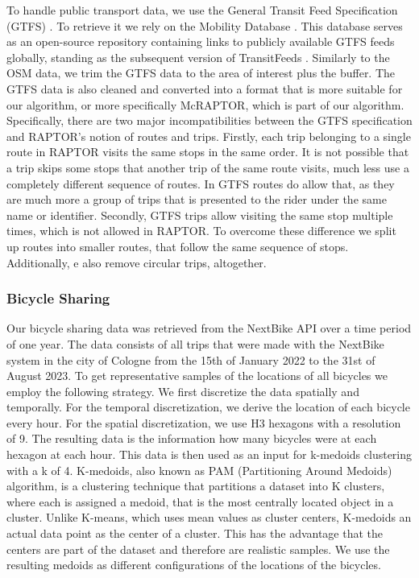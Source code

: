To handle public transport data, we use the General Transit Feed Specification (GTFS) .
To retrieve it we rely on the Mobility Database .
This database serves as an open-source repository containing links to publicly available GTFS feeds globally, standing as the subsequent version of TransitFeeds .
Similarly to the OSM data, we trim the GTFS data to the area of interest plus the buffer.
The GTFS data is also cleaned and converted into a format that is more suitable for our algorithm, or more specifically McRAPTOR, which is part of our algorithm.
Specifically, there are two major incompatibilities between the GTFS specification and RAPTOR's notion of routes and trips.
Firstly, each trip belonging to a single route in RAPTOR visits the same stops in the same order.
It is not possible that a trip skips some stops that another trip of the same route visits, much less use a completely different sequence of routes.
In GTFS routes do allow that, as they are much more a group of trips that is presented to the rider under the same name or identifier.
Secondly, GTFS trips allow visiting the same stop multiple times, which is not allowed in RAPTOR.
To overcome these difference we split up routes into smaller routes, that follow the same sequence of stops.
Additionally, e also remove circular trips, altogether.


\subsubsection{Bicycle Sharing}
\label{subs:bicycle_sharing}

Our bicycle sharing data was retrieved from the NextBike API over a time period of one year.
The data consists of all trips that were made with the NextBike system in the city of Cologne from the 15th of January 2022 to the 31st of August 2023.
To get representative samples of the locations of all bicycles we employ the following strategy.
We first discretize the data spatially and temporally.
For the temporal discretization, we derive the location of each bicycle every hour.
For the spatial discretization, we use H3 hexagons with a resolution of 9.
The resulting data is the information how many bicycles were at each hexagon at each hour.
This data is then used as an input for k-medoids clustering  with a k of 4.
K-medoids, also known as PAM (Partitioning Around Medoids) algorithm, is a clustering technique that partitions a dataset into K clusters, where each is assigned a medoid, that is the most centrally located object in a cluster. 
Unlike K-means, which uses mean values as cluster centers, K-medoids an actual data point as the center of a cluster.
This has the advantage that the centers are part of the dataset and therefore are realistic samples.
We use the resulting medoids as different configurations of the locations of the bicycles.

